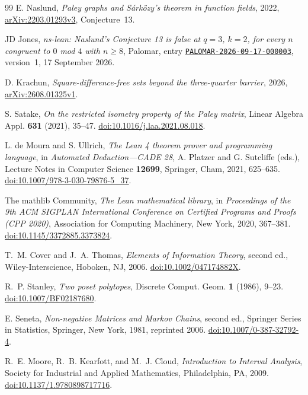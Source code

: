 \documentclass[11pt]{article}
\theoremstyle{definition}
\theoremstyle{remark}
\begin{document}
\begin{thebibliography}{99}
E. Naslund,
\emph{Paley graphs and S\'ark\"ozy's theorem in function fields},
2022, \href{https://arxiv.org/abs/2203.01293v3}{arXiv:2203.01293v3},
Conjecture~13.

JD Jones,
\emph{ns-lean: Naslund's Conjecture 13 is false at $q=3$, $k=2$, for every
$n$ congruent to $0$ mod $4$ with $n\ge8$},
Palomar, entry
\href{https://palomar-registry.org/entry?id=PALOMAR-2026-09-17-000003\&version=1}{\texttt{PALOMAR-2026-09-17-000003}},
version~1, 17 September 2026.

D. Krachun,
\emph{Square-difference-free sets beyond the three-quarter barrier},
2026, \href{https://arxiv.org/abs/2608.01325v1}{arXiv:2608.01325v1}.

S. Satake,
\emph{On the restricted isometry property of the Paley matrix},
Linear Algebra Appl. \textbf{631} (2021), 35--47.
\href{https://doi.org/10.1016/j.laa.2021.08.018}{doi:10.1016/j.laa.2021.08.018}.

L. de Moura and S. Ullrich,
\emph{The Lean 4 theorem prover and programming language},
in \emph{Automated Deduction---CADE 28},
A. Platzer and G. Sutcliffe (eds.),
Lecture Notes in Computer Science \textbf{12699},
Springer, Cham, 2021, 625--635.
\href{https://doi.org/10.1007/978-3-030-79876-5_37}{doi:10.1007/978-3-030-79876-5\_37}.

The mathlib Community,
\emph{The Lean mathematical library},
in \emph{Proceedings of the 9th ACM SIGPLAN International Conference on
Certified Programs and Proofs (CPP 2020)},
Association for Computing Machinery, New York, 2020, 367--381.
\href{https://doi.org/10.1145/3372885.3373824}{doi:10.1145/3372885.3373824}.

T.~M. Cover and J.~A. Thomas,
\emph{Elements of Information Theory}, second ed.,
Wiley-Interscience, Hoboken, NJ, 2006.
\href{https://doi.org/10.1002/047174882X}{doi:10.1002/047174882X}.

R.~P. Stanley,
\emph{Two poset polytopes},
Discrete Comput. Geom. \textbf{1} (1986), 9--23.
\href{https://doi.org/10.1007/BF02187680}{doi:10.1007/BF02187680}.

E. Seneta,
\emph{Non-negative Matrices and Markov Chains}, second ed.,
Springer Series in Statistics, Springer, New York, 1981,
reprinted 2006.
\href{https://doi.org/10.1007/0-387-32792-4}{doi:10.1007/0-387-32792-4}.

R.~E. Moore, R.~B. Kearfott, and M.~J. Cloud,
\emph{Introduction to Interval Analysis},
Society for Industrial and Applied Mathematics, Philadelphia, PA, 2009.
\href{https://doi.org/10.1137/1.9780898717716}{doi:10.1137/1.9780898717716}.

\end{thebibliography}
\end{document}

